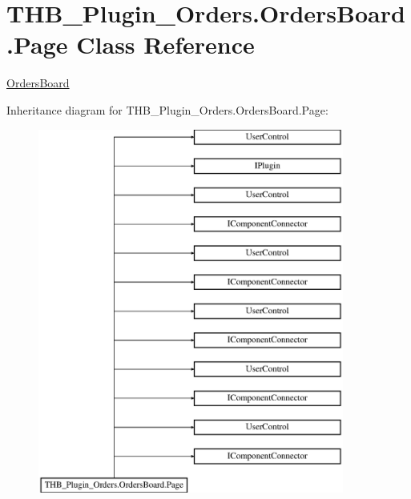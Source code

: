 \hypertarget{class_t_h_b___plugin___orders_1_1_orders_board_1_1_page}{}\section{T\+H\+B\+\_\+\+Plugin\+\_\+\+Orders.\+Orders\+Board.\+Page Class Reference}
\label{class_t_h_b___plugin___orders_1_1_orders_board_1_1_page}


\mbox{\hyperlink{class_t_h_b___plugin___orders_1_1_orders_board}{Orders\+Board}}  


Inheritance diagram for T\+H\+B\+\_\+\+Plugin\+\_\+\+Orders.\+Orders\+Board.\+Page\+:\begin{figure}[H]
\begin{center}
\leavevmode
\includegraphics[height=12.000000cm]{da/d68/class_t_h_b___plugin___orders_1_1_orders_board_1_1_page}
\end{center}
\end{figure}

